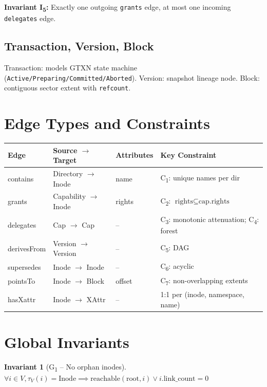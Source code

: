 \documentclass[11pt,a4paper,twoside]{report}
\theoremstyle{definition}
\newtheorem{invariant}{Invariant}[chapter]
\begin{document}
\textbf{Invariant I\textsubscript{5}:} Exactly one outgoing \texttt{grants} edge, at most one incoming \texttt{delegates} edge.

\subsection{Transaction, Version, Block}
Transaction: models GTXN state machine (\texttt{Active/Preparing/Committed/Aborted}).
Version: snapshot lineage node. Block: contiguous sector extent with \texttt{refcount}.

\section{Edge Types and Constraints}

\begin{center}\small
\begin{tabular}{llll}
\toprule
\textbf{Edge} & \textbf{Source $\to$ Target} & \textbf{Attributes} & \textbf{Key Constraint} \\
\midrule
contains & Directory $\to$ Inode & name & C\textsubscript{1}: unique names per dir \\
grants & Capability $\to$ Inode & rights & C\textsubscript{2}: $\text{rights} \subseteq \text{cap.rights}$ \\
delegates & Cap $\to$ Cap & -- & C\textsubscript{3}: monotonic attenuation; C\textsubscript{4}: forest \\
derivesFrom & Version $\to$ Version & -- & C\textsubscript{5}: DAG \\
supersedes & Inode $\to$ Inode & -- & C\textsubscript{6}: acyclic \\
pointsTo & Inode $\to$ Block & offset & C\textsubscript{7}: non-overlapping extents \\
hasXattr & Inode $\to$ XAttr & -- & 1:1 per (inode, namespace, name) \\
\bottomrule
\end{tabular}
\end{center}

\section{Global Invariants}

\begin{invariant}[G\textsubscript{1} -- No orphan inodes]
$\forall i \in V, \tau_V(i) = \text{Inode} \implies \text{reachable}(\text{root}, i) \vee i.\text{link\_count} = 0$
\end{invariant}
\end{document}
